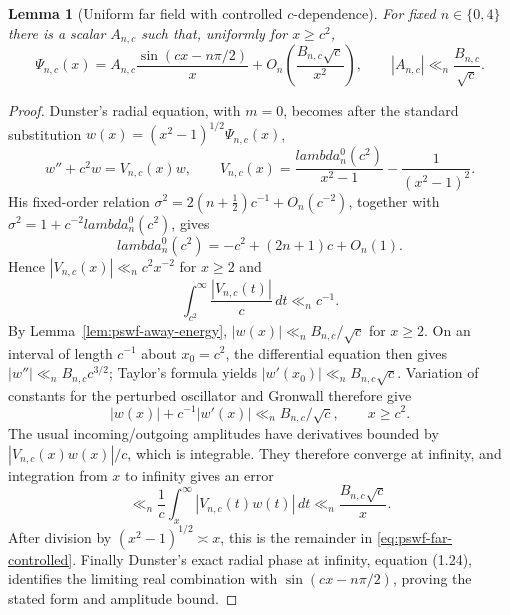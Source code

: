 \documentclass[11pt]{article}
\def\lambda{lambda}%
\newtheorem{lemma}[theorem]{Lemma}
\theoremstyle{remark}
\begin{document}
\begin{lemma}[Uniform far field with controlled $c$-dependence]\label{lem:pswf-far-volterra}
For fixed $n\in\{0,4\}$ there is a scalar $A_{n,c}$ such that, uniformly for $x\ge c^2$,
\begin{equation}\label{eq:pswf-far-controlled}
 \Psi_{n,c}(x)
 =A_{n,c}\frac{\sin(cx-n\pi/2)}{x}
 +O_n\!\left(\frac{B_{n,c}\sqrt c}{x^2}\right),
 \qquad
 |A_{n,c}|\ll_n\frac{B_{n,c}}{\sqrt c}.
\end{equation}
\end{lemma}
\begin{proof}
Dunster's radial equation, with $m=0$, becomes after the standard substitution
$w(x)=(x^2-1)^{1/2}\Psi_{n,c}(x)$,
\[
 w''+c^2w=V_{n,c}(x)w,
 \qquad
 V_{n,c}(x)=\frac{\lambda_n^0(c^2)}{x^2-1}-\frac1{(x^2-1)^2}.
\]
His fixed-order relation $\sigma^2=2(n+\tfrac12)c^{-1}+O_n(c^{-2})$, together with
$\sigma^2=1+c^{-2}\lambda_n^0(c^2)$, gives
\[
 \lambda_n^0(c^2)=-c^2+(2n+1)c+O_n(1).
\]
Hence $|V_{n,c}(x)|\ll_n c^2x^{-2}$ for $x\ge2$ and
\[
 \int_{c^2}^\infty \frac{|V_{n,c}(t)|}{c}\,dt\ll_n c^{-1}.
\]
By Lemma~\ref{lem:pswf-away-energy}, $|w(x)|\ll_n B_{n,c}/\sqrt c$ for $x\ge2$.  On an interval of length $c^{-1}$ about $x_0=c^2$, the differential equation then gives
$|w''|\ll_n B_{n,c}c^{3/2}$; Taylor's formula yields
$|w'(x_0)|\ll_n B_{n,c}\sqrt c$.  Variation of constants for the perturbed oscillator and Gronwall therefore give
\[
 |w(x)|+c^{-1}|w'(x)|\ll_n B_{n,c}/\sqrt c,
 \qquad x\ge c^2.
\]
The usual incoming/outgoing amplitudes have derivatives bounded by
$|V_{n,c}(x)w(x)|/c$, which is integrable.  They therefore converge at infinity, and integration from $x$ to infinity gives an error
\[
 \ll_n \frac1c\int_x^\infty |V_{n,c}(t)w(t)|\,dt
 \ll_n \frac{B_{n,c}\sqrt c}{x}.
\]
After division by $(x^2-1)^{1/2}\asymp x$, this is the remainder in
\eqref{eq:pswf-far-controlled}.  Finally Dunster's exact radial phase at infinity, equation (1.24), identifies the limiting real combination with
$\sin(cx-n\pi/2)$, proving the stated form and amplitude bound.
\end{proof}
\end{document}
